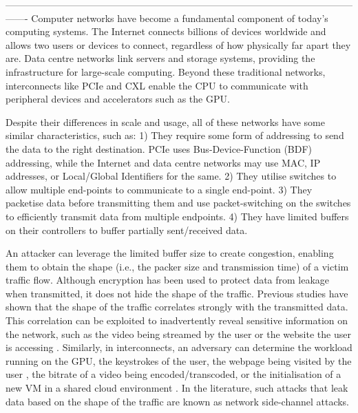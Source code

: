 -------------------------------------------------------------------------------------------------------------------
Computer networks have become a fundamental component of today's computing systems.
The Internet connects billions of devices worldwide and allows two users or devices to connect, regardless of how physically far apart they are.
Data centre networks link servers and storage systems, providing the infrastructure for large-scale computing.
Beyond these traditional networks, interconnects like PCIe and CXL enable the CPU to communicate with peripheral devices and accelerators such as the GPU.

Despite their differences in scale and usage, all of these networks have some similar characteristics, such as:
1) They require some form of addressing to send the data to the right destination. PCIe uses Bus-Device-Function (BDF) addressing, while the Internet and data centre networks may use MAC, IP addresses, or Local/Global Identifiers for the same. 
2) They utilise switches to allow multiple end-points to communicate to a single end-point. 
3) They packetise data before transmitting them and use packet-switching on the switches to efficiently transmit data from multiple endpoints. 
4) They have limited buffers on their controllers to buffer partially sent/received data.

An attacker can leverage the limited buffer size to create congestion, enabling them to obtain the shape (i.e., the packer size and transmission time) of a victim traffic flow.
Although encryption has been used to protect data from leakage when transmitted, it does not hide the shape of the traffic.
Previous studies have shown that the shape of the traffic correlates strongly with the transmitted data. 
This correlation can be exploited to inadvertently reveal sensitive information on the network, such as the video being streamed by the user \cite{schuster2017beautyburst} or the website the user is accessing \cite{bhat2019varcnn, wang2014supersequence}. 
Similarly, in interconnects, an adversary can determine the workload running on the GPU, the keystrokes of the user, the webpage being visited by the user \cite{tan2021invisible}, the bitrate of a video being encoded/transcoded, or the initialisation of a new VM in a shared cloud environment \cite{giechaskiel2022cross}. 
In the literature, such attacks that leak data based on the shape of the traffic are known as network side-channel attacks.

